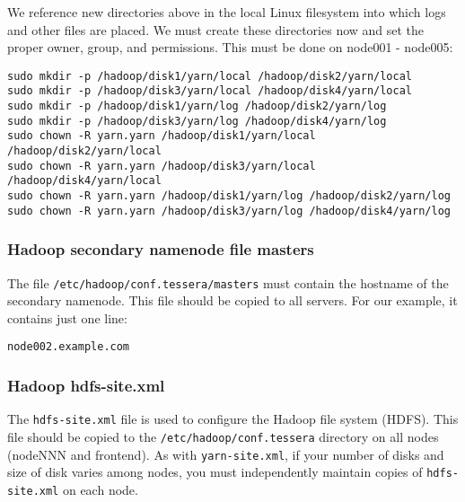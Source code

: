 We reference new directories above in the local Linux filesystem into which
logs and other files are placed.  We must create these directories now
and set the proper owner, group, and permissions.  This must be done on
node001 - node005:

\begin{verbatim}
sudo mkdir -p /hadoop/disk1/yarn/local /hadoop/disk2/yarn/local
sudo mkdir -p /hadoop/disk3/yarn/local /hadoop/disk4/yarn/local
sudo mkdir -p /hadoop/disk1/yarn/log /hadoop/disk2/yarn/log
sudo mkdir -p /hadoop/disk3/yarn/log /hadoop/disk4/yarn/log
sudo chown -R yarn.yarn /hadoop/disk1/yarn/local /hadoop/disk2/yarn/local
sudo chown -R yarn.yarn /hadoop/disk3/yarn/local /hadoop/disk4/yarn/local
sudo chown -R yarn.yarn /hadoop/disk1/yarn/log /hadoop/disk2/yarn/log
sudo chown -R yarn.yarn /hadoop/disk3/yarn/log /hadoop/disk4/yarn/log
\end{verbatim}

\subsubsection{Hadoop secondary namenode file masters}
The file \verb|/etc/hadoop/conf.tessera/masters| must contain the hostname
of the secondary namenode.  This file should be copied to all servers.
For our example, it contains just one line:

\begin{verbatim}
node002.example.com
\end{verbatim}

\subsubsection{Hadoop hdfs-site.xml}
The \verb|hdfs-site.xml| file is used to configure the
Hadoop file system (HDFS).   This file should be copied to the
\verb|/etc/hadoop/conf.tessera| directory on all nodes (nodeNNN and
frontend).  As with \verb|yarn-site.xml|, if your number of disks and
size of disk varies among nodes, you must independently maintain copies
of \verb|hdfs-site.xml| on each node.

